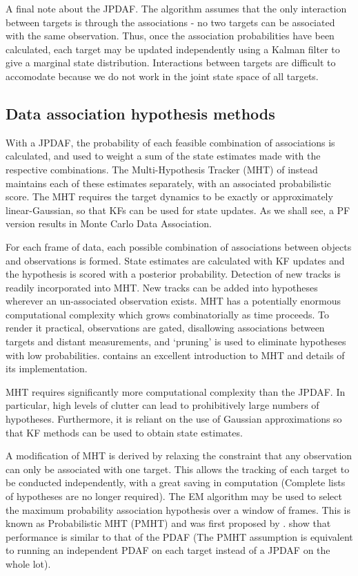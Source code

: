 A final note about the JPDAF. The algorithm assumes that the only interaction between targets is through the associations - no two targets can be associated with the same observation. Thus, once the association probabilities have been calculated, each target may be updated independently using a Kalman filter to give a marginal state distribution. Interactions between targets are difficult to accomodate because we do not work in the joint state space of all targets.



\subsection{Data association hypothesis methods}
With a JPDAF, the probability of each feasible combination of associations is calculated, and used to weight a sum of the state estimates made with the respective combinations. The Multi-Hypothesis Tracker (MHT) of \cite{Reid1979} instead maintains each of these estimates separately, with an associated probabilistic score. The MHT requires the target dynamics to be exactly or approximately linear-Gaussian, so that KFs can be used for state updates. As we shall see, a PF version results in Monte Carlo Data Association.

For each frame of data, each possible combination of associations between objects and observations is formed. State estimates are calculated with KF updates and the hypothesis is scored with a posterior probability. Detection of new tracks is readily incorporated into MHT. New tracks can be added into hypotheses wherever an un-associated observation exists. MHT has a potentially enormous computational complexity which grows combinatorially as time proceeds. To render it practical, observations are gated, disallowing associations between targets and distant measurements, and `pruning' is used to eliminate hypotheses with low probabilities. \cite{Blackman2004} contains an excellent introduction to MHT and details of its implementation.

MHT requires significantly more computational complexity than the JPDAF. In particular, high levels of clutter can lead to prohibitively large numbers of hypotheses. Furthermore, it is reliant on the use of Gaussian approximations so that KF methods can be used to obtain state estimates. 

A modification of MHT is derived by relaxing the constraint that any observation can only be associated with one target. This allows the tracking of each target to be conducted independently, with a great saving in computation (Complete lists of hypotheses are no longer required). The EM algorithm may be used to select the maximum probability association hypothesis over a window of frames. This is known as Probabilistic MHT (PMHT) and was first proposed by \cite{Streit1994}. \cite{Willett2002} show that performance is similar to that of the PDAF (The PMHT assumption is equivalent to running an independent PDAF on each target instead of a JPDAF on the whole lot).

